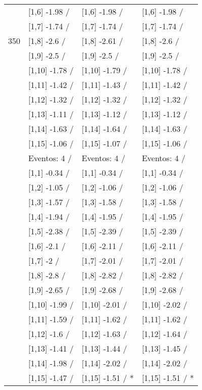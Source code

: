 \begin{table}
\begin{tabular}[t]{llll}
 & {}[1,6] -1.98  / & {}[1,6] -1.98  / & {}[1,6] -1.98  /\\
 & {}[1,7] -1.74  / & {}[1,7] -1.74  / & {}[1,7] -1.74  /\\
350 & {}[1,8] -2.6  / & {}[1,8] -2.61  / & {}[1,8] -2.6  /\\
\addlinespace
 & {}[1,9] -2.5  / & {}[1,9] -2.5  / & {}[1,9] -2.5  /\\
 & {}[1,10] -1.78  / & {}[1,10] -1.79  / & {}[1,10] -1.78  /\\
 & {}[1,11] -1.42  / & {}[1,11] -1.43  / & {}[1,11] -1.42  /\\
 & {}[1,12] -1.32  / & {}[1,12] -1.32  / & {}[1,12] -1.32  /\\
 & {}[1,13] -1.11  / & {}[1,13] -1.12  / & {}[1,13] -1.12  /\\
\addlinespace
 & {}[1,14] -1.63  / & {}[1,14] -1.64  / & {}[1,14] -1.63  /\\
 & {}[1,15] -1.06  / & {}[1,15] -1.07  / & {}[1,15] -1.06  /\\
 & Eventos:  4 / & Eventos:  4 / & Eventos:  4 /\\
 & {}[1,1] -0.34  / & {}[1,1] -0.34  / & {}[1,1] -0.34  /\\
 & {}[1,2] -1.05  / & {}[1,2] -1.06  / & {}[1,2] -1.06  /\\
\addlinespace
 & {}[1,3] -1.57  / & {}[1,3] -1.58  / & {}[1,3] -1.58  /\\
 & {}[1,4] -1.94  / & {}[1,4] -1.95  / & {}[1,4] -1.95  /\\
 & {}[1,5] -2.38  / & {}[1,5] -2.39  / & {}[1,5] -2.39  /\\
 & {}[1,6] -2.1  / & {}[1,6] -2.11  / & {}[1,6] -2.11  /\\
 & {}[1,7] -2  / & {}[1,7] -2.01  / & {}[1,7] -2.01  /\\
\addlinespace
500 & {}[1,8] -2.8  / & {}[1,8] -2.82  / & {}[1,8] -2.82  /\\
 & {}[1,9] -2.65  / & {}[1,9] -2.68  / & {}[1,9] -2.68  /\\
 & {}[1,10] -1.99  / & {}[1,10] -2.01  / & {}[1,10] -2.02  /\\
 & {}[1,11] -1.59  / & {}[1,11] -1.62  / & {}[1,11] -1.62  /\\
 & {}[1,12] -1.6  / & {}[1,12] -1.63  / & {}[1,12] -1.64  /\\
\addlinespace
 & {}[1,13] -1.41  / & {}[1,13] -1.44  / & {}[1,13] -1.45  /\\
 & {}[1,14] -1.98  / & {}[1,14] -2.02  / & {}[1,14] -2.02  /\\
 & {}[1,15] -1.47  / & {}[1,15] -1.51  / * & {}[1,15] -1.51  / *\\
\bottomrule
\end{tabular}
\end{table}
